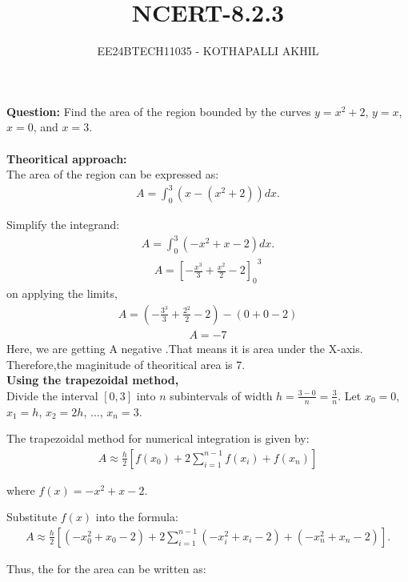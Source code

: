 \documentclass[article]{IEEEtran}
\numberwithin{figure}{enumi}
\begin{document}

\title{NCERT-8.2.3}
\author{EE24BTECH11035 - KOTHAPALLI AKHIL}
{\let\newpage\relax\maketitle}

\noindent\textbf{Question: }  
Find the area of the region bounded by the curves $y = x^2 + 2$, $y = x$, $x = 0$, and $x = 3$.\\
\solution \\
\textbf{Theoritical approach: }\\
The area of the region can be expressed as:
\begin{align}
   A = \int_0^3 \left( x - (x^2 + 2) \right) dx. 
\end{align}

Simplify the integrand:
\begin{align}
A = \int_0^3 \left( -x^2 + x - 2 \right) dx.
\end{align}
\begin{align}
    A={\left[-\frac{x^3}{3}+\frac{x^2}{2}-2\right]_0}^3
\end{align}
on applying the limits,
\begin{align}
   A=(-\frac{3^3}{3}+\frac{2^2}{2}-2)-(0+0-2)
\end{align}
\begin{align}
    A=-7
\end{align}
Here, we are getting A negative .That means it is area under the X-axis.
Therefore,the maginitude of theoritical area is 7.\\
\textbf{Using the trapezoidal method,}\\ Divide the interval $[0, 3]$ into $n$ subintervals of width $h = \frac{3-0}{n} = \frac{3}{n}$. Let $x_0 = 0$, $x_1 = h$, $x_2 = 2h$, $\dots$, $x_n = 3$.

The trapezoidal method for numerical integration is given by:
\begin{align}
  A \approx \frac{h}{2} \left[ f(x_0) + 2\sum_{i=1}^{n-1} f(x_i) + f(x_n) \right]  
\end{align}

where $f(x) = -x^2 + x - 2$.

Substitute $f(x)$ into the formula:
\begin{align}
    A \approx \frac{h}{2} \left[ (-x_0^2 + x_0 - 2) + 2\sum_{i=1}^{n-1} (-x_i^2 + x_i - 2) + (-x_n^2 + x_n - 2) \right].
\end{align}


Thus, the for the area can be written as:
\end{document}

